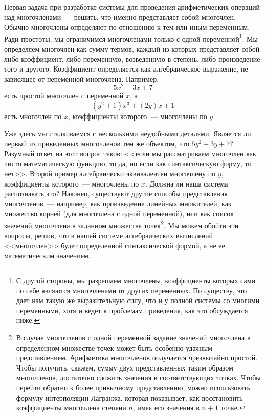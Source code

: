 %
%
%
Первая задача при разработке системы для проведения
арифметических операций над многочленами~--- решить, что именно
представляет собой многочлен.  Обычно многочлены определяют по
отношению к тем или иным переменным.  Ради простоты, мы ограничимся
многочленами только с одной 
переменной\footnote{С другой стороны, мы разрешаем многочлены,
коэффициенты которых сами по себе являются многочленами от других
переменных.  По существу, это дает нам такую же выразительную силу, что
и у полной системы со многими переменными, хотя и ведет к проблемам
приведения, как это обсуждается ниже.}.
Мы определяем многочлен как сумму термов, каждый из которых
представляет собой либо коэффициент, либо переменную, возведенную в
степень, либо произведение того и другого.  Коэффициент определяется
как алгебраическое выражение, не зависящее от переменной
многочлена.  Например,
$$
5x^2 + 3x + 7
$$
есть простой многочлен с переменной
$x$, а
$$
(y^2 + 1)x^3 + (2y)x + 1
$$ есть многочлен
по $x$, коэффициенты которого~---  многочлены по
$y$.

Уже здесь мы сталкиваемся с несколькими
неудобными деталями.  Является ли первый из приведенных многочленов
тем же объектом, что $5y^2 + 3y + 7$?  Разумный
ответ на этот вопрос таков: <<если мы
рассматриваем многочлен как чисто математическую функцию, то да, но
если как синтаксическую форму, то нет>>.  Второй пример алгебраически
эквивалентен многочлену по $y$, коэффициенты
которого~---  многочлены по $x$.  Должна ли наша
система распознавать это?  Наконец, существуют другие способы
представления многочленов~---  например, как произведение линейных
множителей, как множество корней (для многочлена с одной переменной),
или как список значений многочлена в заданном множестве точек\footnote{В случае многочленов с одной переменной задание
значений многочлена в определенном множестве точек может быть особенно
удачным представлением.  Арифметика многочленов получается чрезвычайно
простой.  Чтобы получить, скажем, сумму двух представленных таким
образом многочленов, достаточно сложить значения в соответствующих
точках.  Чтобы перейти обратно к более привычному представлению, можно
использовать 
формулу интерполяции Лагранжа, которая
показывает, как
восстановить коэффициенты многочлена степени
$n$, имея его значения в
$n+1$ точке.}.
Мы можем обойти эти вопросы, решив, что в нашей системе алгебраических
вычислений <<многочлен>> будет определенной синтаксической формой, а не
ее математическим значением.

